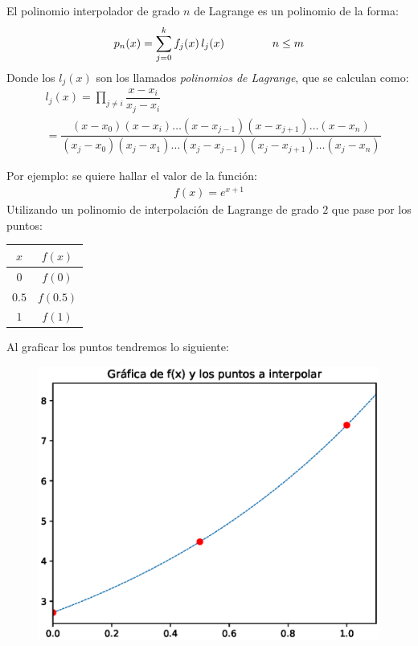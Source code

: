 El polinomio interpolador de grado $n$ de Lagrange es un polinomio de la forma:
\begin{align*}
p_{n}(x) = \sum_{j=0}^{k} f_{j}(x) \, l_{j}(x) \hspace{1.5cm} n \leq m
\end{align*}
Donde los $l_{j}(x)$ son los llamados \emph{polinomios de Lagrange}, que se calculan como:
\begin{align*}
&{}l_{j}(x) = \prod_{j \neq i} \dfrac{x - x_{i}}{x_{j} - x_{i}} \\[0.5em]
&= \dfrac{(x - x_{0})(x - x_{i}) \ldots(x - x_{j-1})(x - x_{j+1}) \ldots (x - x_{n})}{(x_{j} - x_{0})(x_{j} - x_{1}) \ldots(x_{j} - x_{j-1})(x_{j} - x_{j+1}) \ldots (x_{j} - x_{n})}
\end{align*}

Por ejemplo: se quiere hallar el valor de la función:
\begin{align*}
f(x) = e^{x+1}
\end{align*}
Utilizando un polinomio de interpolación de Lagrange de grado $2$ que pase por los puntos:
\begin{table}[H]
\centering
\large
\begin{tabular}{c | c}
$x$ & $f(x)$ \\ \hline
$0$ & $f(0)$ \\
$0.5$ & $f(0.5)$ \\
$1$ & $f(1)$ \\
\end{tabular}
\end{table}

Al graficar los puntos tendremos lo siguiente:
\begin{figure}[H]
   \centering  
   \includegraphics[scale=0.65]{Imagenes/Ejemplo_interpolacion_Chebychev_01.eps}
\end{figure}

